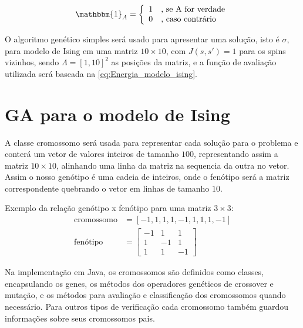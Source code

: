 \begin{equation*}
\mathbbm{1}_{A} = \left\{ \begin{array}{ll} 
		1 & \mbox{, se A for verdade}   \\
		0 & \mbox{, caso contrário}
		\end{array}
		\right.
\end{equation*}

O algoritmo genético simples será usado para apresentar uma solução, isto é \(\sigma\), para modelo de Ising em uma matriz \(10 \times 10\), com \(J(s,s') = 1\) para os spins vizinhos, sendo \(\Lambda = \left[1,10\right]^2\) as posições da matriz, e a função de avaliação utilizada será baseada na \autoref{eq:Energia_modelo_ising}.

\section{GA para o modelo de Ising}
A classe cromossomo será usada para representar cada solução para o problema e conterá um vetor de valores inteiros de tamanho $100$, representando assim a matriz \( 10 \times 10 \), alinhando uma linha da matriz na sequencia da outra no vetor. Assim o nosso genótipo é uma cadeia de inteiros, onde o fenótipo será a matriz correspondente quebrando o vetor em linhas de tamanho $10$.

Exemplo da relação genótipo x fenótipo para uma matriz \( 3 \times 3 \):
\begin{align*}
\text{cromossomo} &= \left[-1, 1, 1, 1, -1, 1, 1, 1, -1 \right]\\
\text{fenótipo} &= \begin{bmatrix}
-1 & 1 & 1 \\
1 & -1 & 1 \\
1 & 1 & -1
\end{bmatrix}
\end{align*}

Na implementação em Java, os cromossomos são definidos como classes, encapsulando os genes, os métodos dos operadores genéticos de crossover e mutação, e os métodos para avaliação e classificação dos cromossomos quando necessário. Para outros tipos de verificação cada cromossomo também guardou informações sobre seus cromossomos pais.

